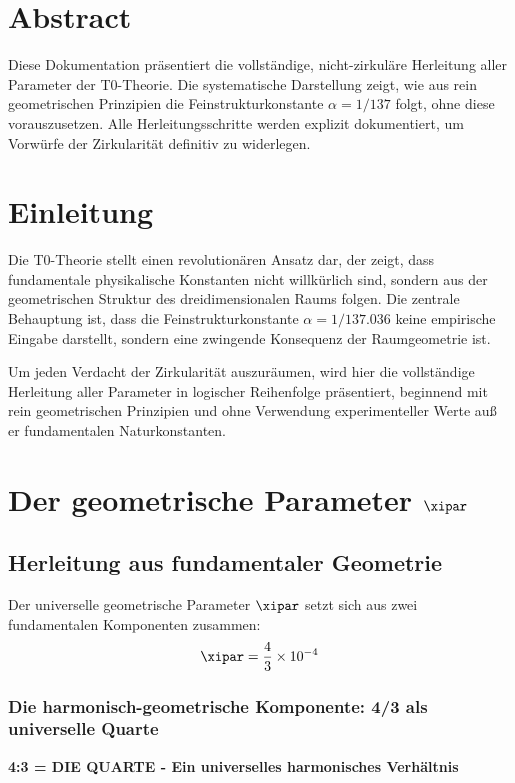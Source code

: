 \section*{Abstract}
		Diese Dokumentation präsentiert die vollständige, nicht-zirkuläre Herleitung aller Parameter der T0-Theorie. Die systematische Darstellung zeigt, wie aus rein geometrischen Prinzipien die Feinstrukturkonstante $\alpha = 1/137$ folgt, ohne diese vorauszusetzen. Alle Herleitungsschritte werden explizit dokumentiert, um Vorwürfe der Zirkularität definitiv zu widerlegen.

	
	\section{Einleitung}
	
	Die T0-Theorie stellt einen revolutionären Ansatz dar, der zeigt, dass fundamentale physikalische Konstanten nicht willkürlich sind, sondern aus der geometrischen Struktur des dreidimensionalen Raums folgen. Die zentrale Behauptung ist, dass die Feinstrukturkonstante $\alpha = 1/137.036$ keine empirische Eingabe darstellt, sondern eine zwingende Konsequenz der Raumgeometrie ist.
	
	Um jeden Verdacht der Zirkularität auszuräumen, wird hier die vollständige Herleitung aller Parameter in logischer Reihenfolge präsentiert, beginnend mit rein geometrischen Prinzipien und ohne Verwendung experimenteller Werte auß er fundamentalen Naturkonstanten.
\section{Der geometrische Parameter $\xipar$}

\subsection{Herleitung aus fundamentaler Geometrie}

Der universelle geometrische Parameter $\xipar$ setzt sich aus zwei fundamentalen Komponenten zusammen:
\begin{equation}
	\xipar = \frac{4}{3} \times 10^{-4}
\end{equation}

\subsubsection{Die harmonisch-geometrische Komponente: 4/3 als universelle Quarte}

\textbf{4:3 = DIE QUARTE - Ein universelles harmonisches Verhältnis}

